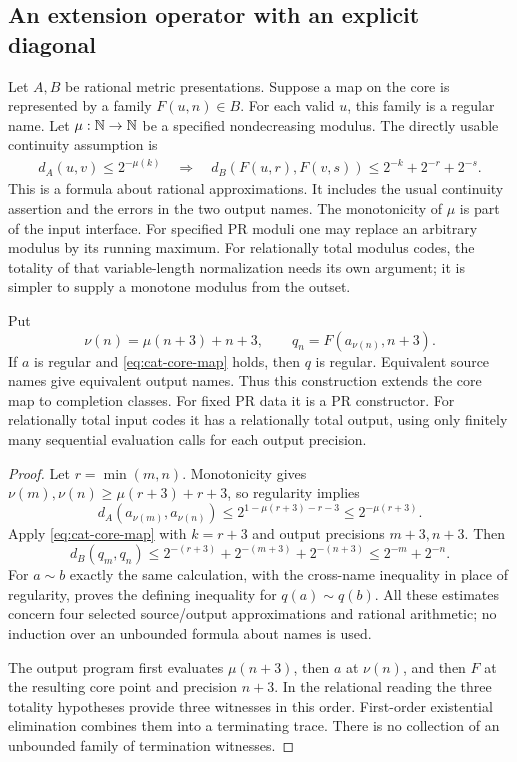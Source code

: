 \subsection{An extension operator with an explicit diagonal}

Let $A,B$ be rational metric presentations. Suppose a map on the core is
represented by a family $F(u,n)\in B$. For each valid $u$, this family is a
regular name. Let $\mu:\mathbb N\to\mathbb N$ be a specified nondecreasing modulus.
The directly usable continuity assumption is
\begin{equation}
\begin{split}
 d_A(u,v)\leq 2^{-\mu(k)}\quad\Longrightarrow\quad
 d_B(F(u,r),F(v,s))
 \leq 2^{-k}+2^{-r}+2^{-s}.
\end{split}
\label{eq:cat-core-map}
\end{equation}
This is a formula about rational approximations. It includes the usual
continuity assertion and the errors in the two output names. The monotonicity
of $\mu$ is part of the input interface. For specified PR moduli one may
replace an arbitrary modulus by its running maximum. For relationally total
modulus codes, the totality of that variable-length normalization needs its
own argument; it is simpler to supply a monotone modulus from the outset.

\begin{theorem}
\label{thm:cat-extension}
Put
\[
 \nu(n)=\mu(n+3)+n+3,
 \qquad q_n=F(a_{\nu(n)},n+3).
\]
If $a$ is regular and \eqref{eq:cat-core-map} holds, then $q$ is regular.
Equivalent source names give equivalent output names. Thus this construction
extends the core map to completion classes. For fixed PR data it is a PR
constructor. For relationally total input codes it has a relationally total
output, using only finitely many sequential evaluation calls for each output
precision.
\end{theorem}

\begin{proof}
Let $r=\min(m,n)$. Monotonicity gives
$\nu(m),\nu(n)\geq \mu(r+3)+r+3$, so regularity implies
\[
 d_A(a_{\nu(m)},a_{\nu(n)})
 \leq 2^{1-\mu(r+3)-r-3}
 \leq 2^{-\mu(r+3)}.
\]
Apply \eqref{eq:cat-core-map} with $k=r+3$ and output precisions $m+3,n+3$.
Then
\begin{equation}
 d_B(q_m,q_n)
 \leq 2^{-(r+3)}+2^{-(m+3)}+2^{-(n+3)}
 \leq 2^{-m}+2^{-n}.
 \label{eq:cat-diagonal-bound}
\end{equation}
For $a\sim b$ exactly the same calculation, with the cross-name inequality
in place of regularity, proves the defining inequality for
$q(a)\sim q(b)$. All these estimates concern four selected source/output
approximations and rational arithmetic; no induction over an unbounded
formula about names is used.

The output program first evaluates $\mu(n+3)$, then $a$ at $\nu(n)$, and
then $F$ at the resulting core point and precision $n+3$. In the relational
reading the three totality hypotheses provide three witnesses in this order.
First-order existential elimination combines them into a terminating trace.
There is no collection of an unbounded family of termination witnesses.
\end{proof}

